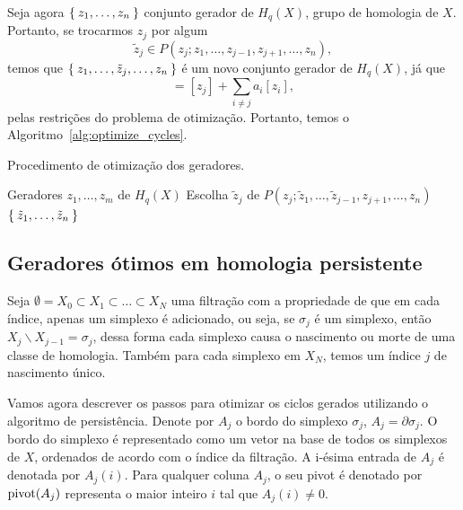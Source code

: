 Seja agora $\Set{z_1, \dots, z_n}$ conjunto gerador de $H_q(X)$, grupo de homologia
de $X$. Portanto, se trocarmos $z_j$ por algum
\begin{equation*}
    \tilde{z}_j \in P(z_j; z_1, \dots, z_{j-1}, z_{j+1}, \dots, z_n),
\end{equation*}
temos que $\Set{z_1, \dots, \tilde{z}_j, \dots, z_n}$ é um novo conjunto gerador 
de $H_q(X)$, já que 
\begin{equation*}
    [\tilde{z}_j] = [z_j] + \sum_{i\neq j} a_i [z_i],
\end{equation*}
pelas restrições do problema de otimização. Portanto, temos o Algoritmo~\ref{alg:optimize_cycles}.
\begin{algoritmo}[!htpb]
  \caption{Procedimento de otimização dos geradores.}
  \label{alg:optimize_cycles}
  \begin{algorithmic}[1]
    \Require Geradores $z_1, \dots, z_m$ de $H_q(X)$
        \State Escolha $\tilde{z}_j$ de $P(z_j; \tilde{z}_1, \dots,
         \tilde{z}_{j-1}, z_{j+1}, \dots, z_n)$
    \EndFor    
    \State \Return $\Set{\tilde{z}_1, \dots, \tilde{z}_n}$
    \EndFunction
  \end{algorithmic}
\end{algoritmo}


\subsection{Geradores ótimos em homologia persistente}

Seja $\emptyset = X_0 \subset X_1 \subset \dots \subset X_N$ uma filtração com a propriedade de que 
em cada índice, apenas um simplexo é adicionado, ou seja, se $\sigma_j$ é um simplexo, então
$X_j \backslash X_{j-1} = \sigma_j$, dessa forma cada simplexo causa o nascimento ou morte de uma 
classe de homologia. Também para cada simplexo em $X_N$, temos um índice $j$ de nascimento único. 

Vamos agora descrever os passos para otimizar os ciclos gerados utilizando o algoritmo de persistência.
Denote por $A_j$ o bordo do simplexo $\sigma_j$, $A_j = \partial \sigma_j$. O bordo do simplexo é
representado como um vetor na base de todos os simplexos de $X$, ordenados de acordo com o índice da
filtração. A i-ésima entrada de $A_j$ é denotada por $A_j(i)$. Para qualquer coluna
$A_j$, o seu pivot é denotado por $\text{pivot}(A_j)$ representa o maior inteiro $i$ tal que 
$A_j(i) \neq 0$.

